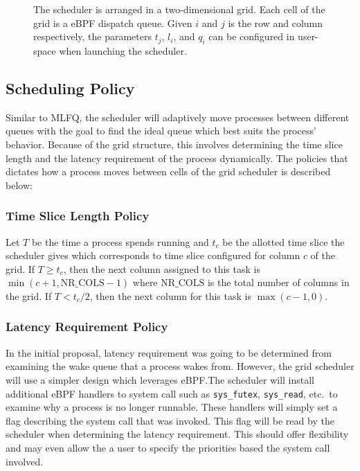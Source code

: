 \documentclass[letterpaper,twocolumn,10pt]{article}
\begin{document}
\begin{figure}
  \begin{center}
    
  \end{center}
  \captionsetup{font=scriptsize}
  \vspace{-10pt}
  \caption{\scriptsize\label{fig:mlfq_grid} The scheduler is arranged in a 
  two-dimensional grid. Each cell of the grid is a eBPF dispatch queue.
  Given \(i\) and \(j\) is the row and column respectively, the parameters 
  \(t_j\), \(l_i\), and \(q_i\) can be configured in user-space when
  launching the scheduler.}
\end{figure}

\subsection{Scheduling Policy}

Similar to MLFQ, the scheduler will adaptively move processes between different
queues with the goal to find the ideal queue which best suits the process'
behavior. Because of the grid structure, this involves determining the time
slice length and the latency requirement of the process dynamically. The
policies that dictates how a process moves between cells of the grid scheduler
is described below:

\subsubsection{Time Slice Length Policy}\label{sec:timeslice}

Let \(T\) be the time a process spends running and \(t_c\) be the allotted 
time slice the scheduler gives which corresponds to time slice configured
for column \(c\) of the grid. If \(T\ge t_c\), then the next column assigned
to this task is \(\min(c+1,\text{NR\_COLS}-1)\) where \(\text{NR\_COLS}\) is
the total number of columns in the grid. If \(T < t_c/2\), then the next
column for this task is \(\max(c-1,0)\).

\subsubsection{Latency Requirement Policy}\label{sec:latency}

In the initial proposal, latency requirement was going to be determined from
examining the wake queue that a process wakes from. However, the grid scheduler
will use a simpler design which leverages eBPF.\@ The scheduler will install 
additional eBPF handlers to system call such as \texttt{sys\_futex}, 
\texttt{sys\_read}, etc.\ to examine why a process is no longer runnable. These
handlers will simply set a flag describing the system call that was invoked.
This flag will be read by the scheduler when determining the latency requirement.
This should offer flexibility and may even allow the a user to specify the priorities 
based the system call involved.
\end{document}
